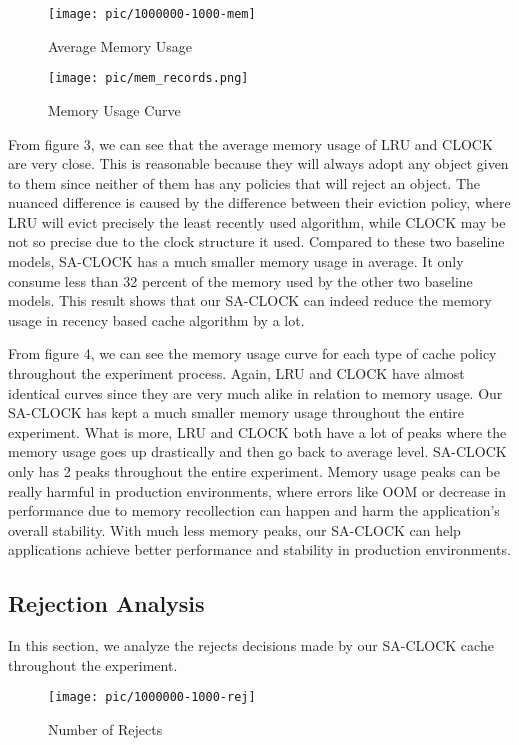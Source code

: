 \documentclass[conference]{IEEEtran}
\begin{document}
\begin{figure}[h]
\centerline{\texttt{[image: pic/1000000-1000-mem]}}
\caption{Average Memory Usage}
\label{fig}
\end{figure}

\begin{figure}[h]
\centerline{\texttt{[image: pic/mem\_records.png]}}
\caption{Memory Usage Curve}
\label{fig}
\end{figure}

From figure 3, we can see that the average memory usage of LRU and CLOCK are very close. This is reasonable because they will always adopt any object given to them since neither of them has any policies that will reject an object. The nuanced difference is caused by the difference between their eviction policy, where LRU will evict precisely the least recently used algorithm, while CLOCK may be not so precise due to the clock structure it used. Compared to these two baseline models, SA-CLOCK has a much smaller memory usage in average. It only consume less than 32 percent of the memory used by the other two baseline models. This result shows that our SA-CLOCK can indeed reduce the memory usage in recency based cache algorithm by a lot.  

From figure 4, we can see the memory usage curve for each type of cache policy throughout the experiment process. Again, LRU and CLOCK have almost identical curves since they are very much alike in relation to memory usage. Our SA-CLOCK has kept a much smaller memory usage throughout the entire experiment. What is more, LRU and CLOCK both have a lot of peaks where the memory usage goes up drastically and then go back to average level. SA-CLOCK only has 2 peaks throughout the entire experiment. Memory usage peaks can be really harmful in production environments, where errors like OOM or decrease in performance due to memory recollection can happen and harm the application's overall stability. With much less memory peaks, our SA-CLOCK can help applications achieve better performance and stability in production environments.



\subsection{Rejection Analysis}
In this section, we analyze the rejects decisions made by our SA-CLOCK cache throughout the experiment. 

\begin{figure}[h]
\centerline{\texttt{[image: pic/1000000-1000-rej]}}
\caption{Number of Rejects}
\label{fig}
\end{figure}
\end{document}
